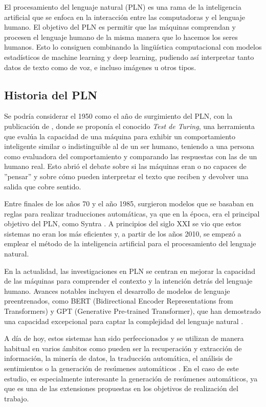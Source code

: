 El procesamiento del lenguaje natural (PLN) es una rama de la inteligencia artificial que se enfoca en la interacción entre las computadoras y el lenguaje humano. El objetivo del PLN es permitir que las máquinas comprendan y procesen el lenguaje humano de la misma manera que lo hacemos los seres humanos. Esto lo consiguen combinando la lingüística computacional con modelos estadísticos de machine learning y deep learning, pudiendo así interpretar tanto datos de texto como de voz, e incluso imágenes u otros tipos.

\subsection{Historia del PLN}

Se podría considerar el 1950 como el año de surgimiento del PLN, con la publicación de \cite{10.1093/mind/LIX.236.433}, donde se proponía el conocido \textit{Test de Turing}, una herramienta que evalúa la capacidad de una máquina para exhibir un comportamiento inteligente similar o indistinguible al de un ser humano, teniendo a una persona como evaluadora del comportamiento y comparando las respuestas con las de un humano real. Esto abrió el debate sobre si las máquinas eran o no capaces de ''pensar'' y sobre cómo pueden interpretar el texto que reciben y devolver una salida que cobre sentido.

Entre finales de los años 70 y el año 1985, surgieron modelos que se basaban en reglas para realizar traducciones automáticas, ya que en la época, era el principal objetivo del PLN, como Syntra \citep{Toma1970SYSTRANMT}. A principios del siglo XXI se vio que estos sistemas no eran los más eficientes y, a partir de los años 2010, se empezó a emplear el método de la inteligencia artificial para el procesamiento del lenguaje natural.

En la actualidad, las investigaciones en PLN se centran en mejorar la capacidad de las máquinas para comprender el contexto y la intención detrás del lenguaje humano. Avances notables incluyen el desarrollo de modelos de lenguaje preentrenados, como BERT (Bidirectional Encoder Representations from Transformers) y GPT (Generative Pre-trained Transformer), que han demostrado una capacidad excepcional para captar la complejidad del lenguaje natural \citep{devlin2019bert}.

A día de hoy, estos sistemas han sido perfeccionados y se utilizan de manera habitual en varios ámbitos como pueden ser la recuperación y extracción de información, la minería de datos, la traducción automática, el análisis de sentimientos o la generación de resúmenes automáticos \citep{hernandez2013aplicaciones}. En el caso de este estudio, es especialmente interesante la generación de resúmenes automáticos, ya que es una de las extensiones propuestas en los objetivos de realización del trabajo.

